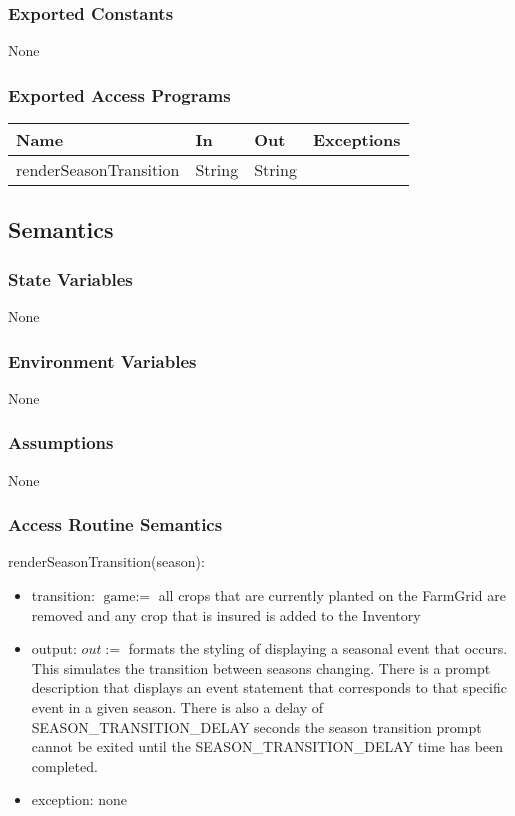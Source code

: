\documentclass[12pt, titlepage]{article}
\begin{document}
\subsubsection{Exported Constants}
None

\subsubsection{Exported Access Programs}

\begin{center}
\begin{tabular}{p{4cm} p{4cm} p{4cm} p{2cm}}
\hline
\textbf{Name} & \textbf{In} & \textbf{Out} & \textbf{Exceptions} \\
\hline
renderSeasonTransition & String & String & \\
\hline

\end{tabular}
\end{center}

\subsection{Semantics}

\subsubsection{State Variables}
None
\subsubsection{Environment Variables}
None

\subsubsection{Assumptions}
None

\subsubsection{Access Routine Semantics}

\noindent renderSeasonTransition(season):
\begin{itemize}
\item transition: $\text{game} := $ all crops that are currently planted on the FarmGrid are removed and any crop that is insured is added to the Inventory
\item output: $out := $  formats the styling of displaying a seasonal event that occurs. This simulates the transition between seasons changing. There is a prompt description that displays an event statement that corresponds to that specific event in a given season. There is also a delay of SEASON\_TRANSITION\_DELAY seconds the season transition prompt cannot be exited until the SEASON\_TRANSITION\_DELAY time has been completed.

\item exception: none
\end{itemize}
\end{document}
